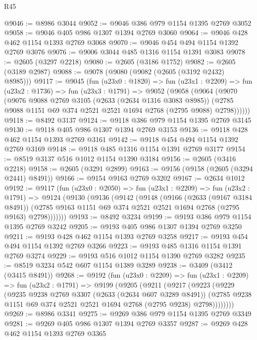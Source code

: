 \begin{lexlean}{R45}
\begin{coremodule}
@9046 := @8986 @3044
@9052 := @9046 @386 @979 @1154 @1395 @2769 @3052
@9058 := @9046 @405 @986 @1307 @1394 @2769 @3060
@9064 := @9046 @428 @462 @1154 @1393 @2769 @3068
@9070 := @9046 @454 @494 @1154 @1392 @2769 @3076
@9076 := @9006 @3044 @485 @1316 @1154 @1391 @3083
@9078 := @2605 (@3297 @2218)
@9080 := @2605 (@3186 @1752)
@9082 := @2605 (@3189 @2987)
@9088 := @9078 (@9080 (@9082 (@2605 (@3192 @2432) @8985)))
@9117 := @9045
    (fun (u23x0 : @1820) =>
    fun (u23x1 : @2209) =>
    fun (u23x2 : @1736) =>
    fun (u23x3 : @1791) =>
    @9052
      (@9058
        (@9064
          (@9070
            (@9076
              @9088
              @2769
              @3105
              (@2633 (@2634 @1316 @3083 @8985))
              (@2785 @9088 @1151 @69 @374 @2521 @2521 @1694 @2768 (@2795 @9088) @2798))))))
@9118 := @8492 @3137
@9124 := @9118 @386 @979 @1154 @1395 @2769 @3145
@9130 := @9118 @405 @986 @1307 @1394 @2769 @3153
@9136 := @9118 @428 @462 @1154 @1393 @2769 @3161
@9142 := @9118 @454 @494 @1154 @1392 @2769 @3169
@9148 := @9118 @485 @1316 @1154 @1391 @2769 @3177
@9154 := @8519 @3137 @516 @1012 @1154 @1390 @3184
@9156 := @2605 (@3416 @2218)
@9158 := @2605 (@3291 @2899)
@9163 := @9156 (@9158 (@2605 (@3294 @2441) @8491))
@9166 := @9154 @9163 @2769 @3202
@9167 := @2634 @1012
@9192 := @9117
    (fun (u23x0 : @2050) =>
    fun (u23x1 : @2209) =>
    fun (u23x2 : @1791) =>
    @9124
      (@9130
        (@9136
          (@9142
            (@9148
              (@9166
                (@2633 (@9167 @3184 @8491))
                (@2785 @9163 @1151 @69 @374 @2521 @2521 @1694 @2768 (@2795 @9163) @2798)))))))
@9193 := @8492 @3234
@9199 := @9193 @386 @979 @1154 @1395 @2769 @3242
@9205 := @9193 @405 @986 @1307 @1394 @2769 @3250
@9211 := @9193 @428 @462 @1154 @1393 @2769 @3258
@9217 := @9193 @454 @494 @1154 @1392 @2769 @3266
@9223 := @9193 @485 @1316 @1154 @1391 @2769 @3274
@9229 := @9193 @516 @1012 @1154 @1390 @2769 @3282
@9235 := @8519 @3234 @542 @607 @1154 @1389 @3289
@9238 := @3409 (@3412 (@3415 @8491))
@9268 := @9192
    (fun (u23x0 : @2209) =>
    fun (u23x1 : @2209) =>
    fun (u23x2 : @1791) =>
    @9199
      (@9205
        (@9211
          (@9217
            (@9223
              (@9229
                (@9235
                  @9238
                  @2769
                  @3307
                  (@2633 (@2634 @607 @3289 @8491))
                  (@2785 @9238 @1151 @69 @374 @2521 @2521 @1694 @2768 (@2795 @9238) @2798))))))))
@9269 := @8986 @3341
@9275 := @9269 @386 @979 @1154 @1395 @2769 @3349
@9281 := @9269 @405 @986 @1307 @1394 @2769 @3357
@9287 := @9269 @428 @462 @1154 @1393 @2769 @3365

\end{coremodule}
\end{lexlean}

